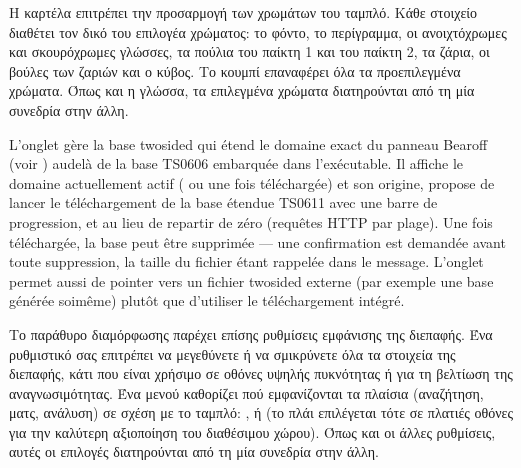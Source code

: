 \documentclass[letterpaper,10pt,greek]{sphinxmanual}
\begin{document}
\sphinxAtStartPar
Η καρτέλα  επιτρέπει την προσαρμογή των χρωμάτων του ταμπλό. Κάθε στοιχείο διαθέτει τον δικό του επιλογέα χρώματος: το φόντο, το περίγραμμα, οι ανοιχτόχρωμες και σκουρόχρωμες γλώσσες, τα πούλια του παίκτη 1 και του παίκτη 2, τα ζάρια, οι βούλες των ζαριών και ο κύβος. Το κουμπί  επαναφέρει όλα τα προεπιλεγμένα χρώματα. Όπως και η γλώσσα, τα επιλεγμένα χρώματα διατηρούνται από τη μία συνεδρία στην άλλη.

\sphinxAtStartPar
L’onglet  gère la base two\sphinxhyphen{}sided qui étend le domaine exact du
panneau Bearoff (voir {\hyperref[\detokenize{manuel:panneau-epc}]{}}) au\sphinxhyphen{}delà de la base TS\sphinxhyphen{}06\sphinxhyphen{}06
embarquée dans l’exécutable. Il affiche le domaine actuellement actif
( ou  une fois téléchargée) et son origine, propose de
lancer le téléchargement de la base étendue TS\sphinxhyphen{}06\sphinxhyphen{}11 avec une barre de
progression, et  au
lieu de repartir de zéro (requêtes HTTP par plage). Une fois téléchargée, la
base peut être supprimée — une confirmation est demandée avant toute
suppression, la taille du fichier étant rappelée dans le message. L’onglet
permet aussi de pointer vers un fichier  two\sphinxhyphen{}sided externe (par exemple
une base générée soi\sphinxhyphen{}même) plutôt que d’utiliser le téléchargement intégré.

\sphinxAtStartPar
Το παράθυρο διαμόρφωσης παρέχει επίσης ρυθμίσεις εμφάνισης της διεπαφής. Ένα ρυθμιστικό  σας επιτρέπει να μεγεθύνετε ή να σμικρύνετε όλα τα στοιχεία της διεπαφής, κάτι που είναι χρήσιμο σε οθόνες υψηλής πυκνότητας ή για τη βελτίωση της αναγνωσιμότητας. Ένα μενού  καθορίζει πού εμφανίζονται τα πλαίσια (αναζήτηση, ματς, ανάλυση) σε σχέση με το ταμπλό: ,  ή  (το πλάι επιλέγεται τότε σε πλατιές οθόνες για την καλύτερη αξιοποίηση του διαθέσιμου χώρου). Όπως και οι άλλες ρυθμίσεις, αυτές οι επιλογές διατηρούνται από τη μία συνεδρία στην άλλη.
\end{document}
